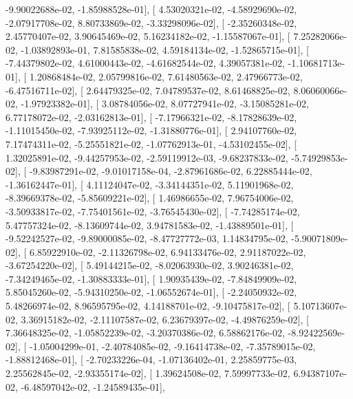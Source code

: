 \documentclass{article}
\begin{document}
         -9.90022688e-02,  -1.85988528e-01],
       [  4.53020321e-02,  -4.58929690e-02,  -2.07917708e-02,
          8.80733869e-02,  -3.33298096e-02],
       [ -2.35260348e-02,   2.45770407e-02,   3.90645469e-02,
          5.16234182e-02,  -1.15587067e-01],
       [  7.25282066e-02,  -1.03892893e-01,   7.81585838e-02,
          4.59184134e-02,  -1.52865715e-01],
       [ -7.44379802e-02,   4.61000443e-02,  -4.61682544e-02,
          4.39057381e-02,  -1.10681713e-01],
       [  1.20868484e-02,   2.05799816e-02,   7.61480563e-02,
          2.47966773e-02,  -6.47516711e-02],
       [  2.64479325e-02,   7.04789537e-02,   8.61468825e-02,
          8.06060066e-02,  -1.97923382e-01],
       [  3.08784056e-02,   8.07727941e-02,  -3.15085281e-02,
          6.77178072e-02,  -2.03162813e-01],
       [ -7.17966321e-02,  -8.17828639e-02,  -1.11015450e-02,
         -7.93925112e-02,  -1.31880776e-01],
       [  2.94107760e-02,   7.17474311e-02,  -5.25551821e-02,
         -1.07762913e-01,  -4.53102455e-02],
       [  1.32025891e-02,  -9.44257953e-02,  -2.59119912e-03,
         -9.68237833e-02,  -5.74929853e-02],
       [ -9.83987291e-02,  -9.01017158e-04,  -2.87961686e-02,
          6.22885444e-02,  -1.36162447e-01],
       [  4.11124047e-02,  -3.34144351e-02,   5.11901968e-02,
         -8.39669378e-02,  -5.85609221e-02],
       [  1.46986655e-02,   7.96754006e-02,  -3.50933817e-02,
         -7.75401561e-02,  -3.76545430e-02],
       [ -7.74285174e-02,   5.47757324e-02,  -8.13609744e-02,
          3.94781583e-02,  -1.43889501e-01],
       [ -9.52242527e-02,  -9.89000085e-02,  -8.47727772e-03,
          1.14834795e-02,  -5.90071809e-02],
       [  6.85922910e-02,  -2.11326798e-02,   6.94133476e-02,
          2.91187022e-02,  -3.67254220e-02],
       [  5.49144215e-02,  -8.02063930e-02,   3.90246381e-02,
         -7.34249465e-02,  -1.30883333e-01],
       [  1.90935439e-02,  -7.84849909e-02,   5.85045260e-02,
         -5.94310250e-02,  -1.06552674e-01],
       [ -2.24050932e-02,   5.48266974e-02,   8.96595795e-02,
          4.14188701e-02,  -9.10475817e-02],
       [  5.10713607e-02,   3.36915182e-02,  -2.11107587e-02,
          6.23679397e-02,  -4.49876259e-02],
       [  7.36648325e-02,  -1.05852239e-02,  -3.20370386e-02,
          6.58862176e-02,  -8.92422569e-02],
       [ -1.05004299e-01,  -2.40784085e-02,  -9.16414738e-02,
         -7.35789015e-02,  -1.88812468e-01],
       [ -2.70233226e-04,  -1.07136402e-01,   2.25859775e-03,
          2.25562845e-02,  -2.93355174e-02],
       [  1.39624508e-02,   7.59997733e-02,   6.94387107e-02,
         -6.48597042e-02,  -1.24589435e-01],
\end{document}
